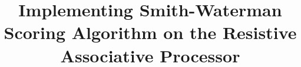 \documentclass[pageno]{jpaper}
\begin{document}
	
	\title{Implementing Smith-Waterman Scoring Algorithm on the Resistive Associative Processor}
	
	\date{}
	\maketitle
	
	\thispagestyle{empty}
	
	\begin{abstract}

	\end{abstract}
	
	
%	
%	
%	
%	
%	
%	
%	
%	
%	
	
\end{document}
